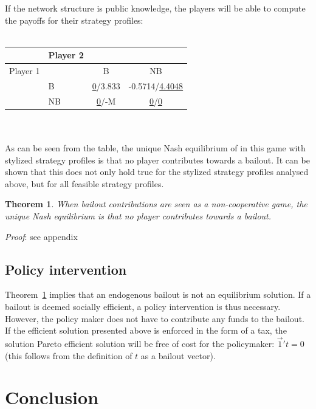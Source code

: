 \documentclass[12pt,a4paper]{article}
\newtheorem{theorem}{Theorem}
\begin{document}
If the network structure is public knowledge, the players will be able to compute the payoffs for their strategy profiles:
\\
\\
\begin{tabular}{|l|l|c|c|}
\hline
 & Player 2 & & \\
\hline
Player 1 & & B & NB \\
\hline
 & B & \underline{0}/3.833 & -0.5714/\underline{4.4048} \\
\hline
 & NB & \underline{0}/-M & \underline{0}/\underline{0} \\
\hline
\end{tabular}
\\
\\

As can be seen from the table, the unique Nash equilibrium of in this game with stylized strategy profiles is that no player contributes towards a bailout. It can be shown that this does not only hold true for the stylized strategy profiles analysed above, but for all feasible strategy profiles.

\begin{theorem} \label{the:equilibrium}
When bailout contributions are seen as a non-cooperative game, the unique Nash equilibrium is that no player contributes towards a bailout.
\end{theorem}

\textit{Proof}: see appendix

\subsection{Policy intervention}
Theorem~\ref{the:equilibrium} implies that an endogenous bailout is not an equilibrium solution. If a bailout is deemed socially efficient, a policy intervention is thus necessary. However, the policy maker does not have to contribute any funds to the bailout. If the efficient solution presented above is enforced in the form of a tax, the solution Pareto efficient solution will be free of cost for the policymaker: $\vec{1}' t=0$ (this follows from the definition of $t$ as a bailout vector).

\section{Conclusion}
\label{sec:conclusion}

 

\end{document}

